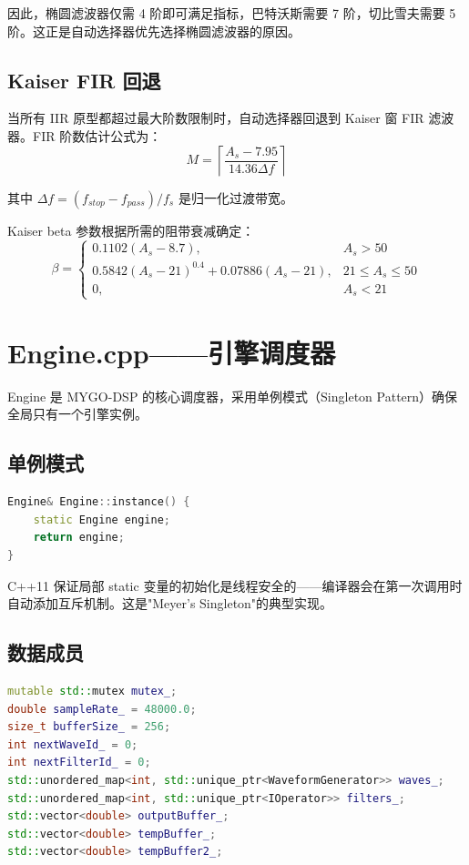 ﻿\documentclass[12pt,a4paper,oneside]{ctexbook}
\begin{document}
因此，椭圆滤波器仅需 4 阶即可满足指标，巴特沃斯需要 7 阶，切比雪夫需要 5 阶。这正是自动选择器优先选择椭圆滤波器的原因。

\subsection{Kaiser FIR 回退}

当所有 IIR 原型都超过最大阶数限制时，自动选择器回退到 Kaiser 窗 FIR 滤波器。FIR 阶数估计公式为：
\[
M = \left\lceil \frac{A_s - 7.95}{14.36 \Delta f} \right\rceil
\]

其中 \(\Delta f = (f_{stop} - f_{pass}) / f_s\) 是归一化过渡带宽。

Kaiser beta 参数根据所需的阻带衰减确定：
\[
\beta = 
\begin{cases}
0.1102(A_s - 8.7), & A_s > 50 \\
0.5842(A_s - 21)^{0.4} + 0.07886(A_s - 21), & 21 \leq A_s \leq 50 \\
0, & A_s < 21
\end{cases}
\]

\section{Engine.cpp——引擎调度器}

Engine 是 MYGO-DSP 的核心调度器，采用单例模式（Singleton Pattern）确保全局只有一个引擎实例。

\subsection{单例模式}

\begin{lstlisting}[language=C++, caption={Engine 单例实现}]
Engine& Engine::instance() {
    static Engine engine;
    return engine;
}
\end{lstlisting}

C++11 保证局部 static 变量的初始化是线程安全的——编译器会在第一次调用时自动添加互斥机制。这是"Meyer's Singleton"的典型实现。

\subsection{数据成员}

\begin{lstlisting}[language=C++, caption={Engine 的数据成员}]
mutable std::mutex mutex_;
double sampleRate_ = 48000.0;
size_t bufferSize_ = 256;
int nextWaveId_ = 0;
int nextFilterId_ = 0;
std::unordered_map<int, std::unique_ptr<WaveformGenerator>> waves_;
std::unordered_map<int, std::unique_ptr<IOperator>> filters_;
std::vector<double> outputBuffer_;
std::vector<double> tempBuffer_;
std::vector<double> tempBuffer2_;
\end{lstlisting}
\end{document}
